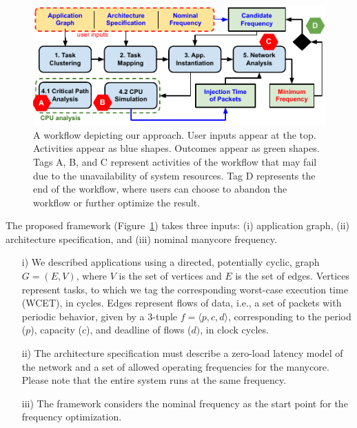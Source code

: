 \begin{frame}
	\begin{figure}[!t]
		\centerline{\includegraphics[width=0.8\columnwidth]{fig/workflow.pdf}}
		\caption{A workflow depicting our approach. User inputs appear at the top. Activities appear as blue shapes. Outcomes appear as green shapes. Tags A, B, and C represent activities of the workflow that may fail due to the unavailability of system resources. Tag D represents the end of the workflow, where users can choose to abandon the workflow or further optimize the result.}
		\label{fig:workflow}
		\vspace{-12 pt}
	\end{figure}
\end{frame}

\begin{frame}

	The proposed framework (Figure~\ref{fig:workflow}) takes three inputs: (i) application graph, (ii) architecture specification, and (iii) nominal manycore frequency. 
	
	\begin{enumerate}
		\item[i)] We described applications using a directed, potentially cyclic, graph $G = (E, V)$, where $V$ is the set of vertices and $E$ is the set of edges. Vertices represent tasks, to which we tag the corresponding worst-case execution time (WCET), in cycles. Edges represent flows of data, i.e., a set of packets with periodic behavior, given by a $3$-tuple $f =\langle p, c, d \rangle$, corresponding to the period ($p$), capacity ($c$), and deadline of flows ($d)$, in clock cycles.
		\item[ii)] The architecture specification must describe a zero-load latency model of the network and a set of allowed operating frequencies for the manycore. Please note that the entire system runs at the same frequency.
		\item[iii)] The framework considers the nominal frequency as the start point for the frequency optimization. 
	\end{enumerate}
\end{frame}

